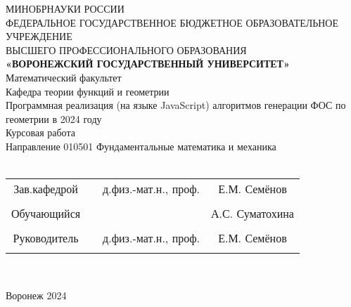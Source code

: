 
\begin{center}
	\hfill \break
	\large{МИНОБРНАУКИ РОССИИ}\\
	\footnotesize{ФЕДЕРАЛЬНОЕ ГОСУДАРСТВЕННОЕ БЮДЖЕТНОЕ ОБРАЗОВАТЕЛЬНОЕ УЧРЕЖДЕНИЕ}\\
	\footnotesize{ВЫСШЕГО ПРОФЕССИОНАЛЬНОГО ОБРАЗОВАНИЯ}\\
	\small{\textbf{«ВОРОНЕЖСКИЙ ГОСУДАРСТВЕННЫЙ УНИВЕРСИТЕТ»}}\\
	\hfill \break
	\normalsize{Математический факультет}\\
	\hfill \break
	\normalsize{Кафедра теории функций и геометрии}\\
	\hfill\break
	\hfill \break
	\hfill \break
	\hfill \break
	\large{Программная реализация (на языке JavaScript) алгоритмов генерации ФОС по геометрии в 2024 году}\\
	\hfill \break
	\hfill \break
	\hfill \break
	\hfill \break
	\hfill \break
	\normalsize{Курсовая работа\\
		\hfill \break
		Направление  010501 Фундаментальные математика и механика\\

		\hfill \break
	}\\
	\hfill \break
	\hfill \break
\end{center}
\hfill \break

\normalsize{
	\begin{tabular}{cccc}
		Зав.кафедрой & \underline{\hspace{3cm}} & д.физ.-мат.н.,  проф. & Е.М. Семёнов    \\\\
		Обучающийся  & \underline{\hspace{3cm}} &                       & А.С. Суматохина \\\\
		Руководитель & \underline{\hspace{3cm}} & д.физ.-мат.н.,  проф. & Е.М. Семёнов    \\\\
	\end{tabular}
}\\
\hfill \break
\hfill \break
\begin{center} Воронеж 2024 \end{center}
\thispagestyle{empty} %

